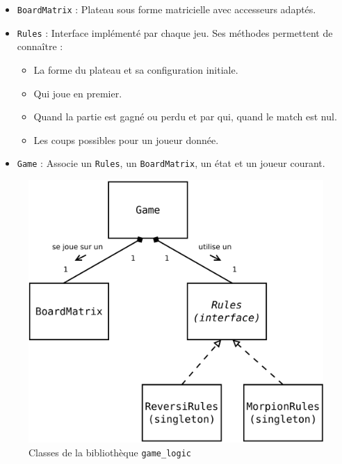 \begin{itemize}
\item \texttt{BoardMatrix} : Plateau sous forme matricielle avec accesseurs adaptés.
\item \texttt{Rules} : Interface implémenté par chaque jeu. Ses méthodes permettent de connaître :

\begin{itemize}
\item La forme du plateau et sa configuration initiale.
\item Qui joue en premier.
\item Quand la partie est gagné ou perdu et par qui, quand le match est nul.
\item Les coups possibles pour un joueur donnée.
\end{itemize}

\item \texttt{Game} : Associe un \texttt{Rules}, un \texttt{BoardMatrix}, un état et un joueur courant.
\end{itemize}

\begin{figure}[H] 
\centering
\includegraphics[width=\textwidth]{files/env/game_logic} 
\caption{Classes de la bibliothèque \texttt{game\_logic}} 
\label{game_logic}
\end{figure}